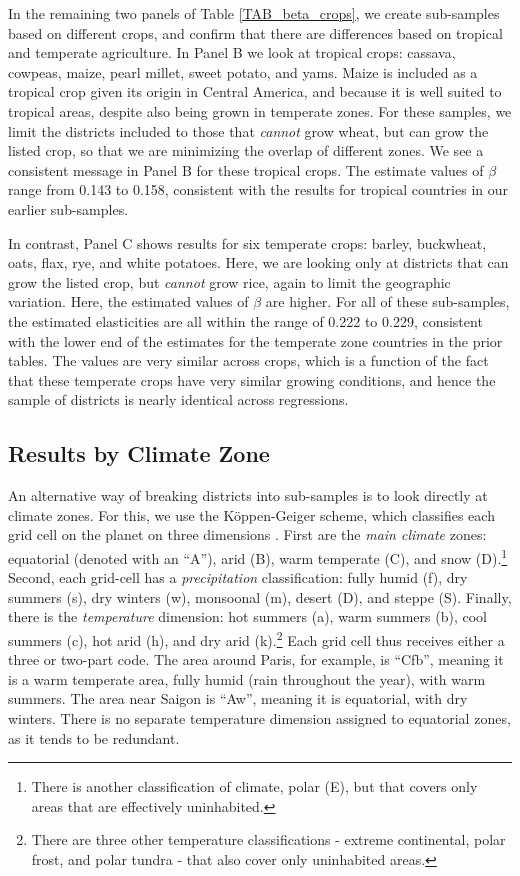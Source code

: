 \documentclass[11pt]{article}
\begin{document}
In the remaining two panels of Table \ref{TAB_beta_crops}, we create sub-samples based on different crops, and confirm that there are differences based on tropical and temperate agriculture. In Panel B we look at tropical crops: cassava, cowpeas, maize, pearl millet, sweet potato, and yams. Maize is included as a tropical crop given its origin in Central America, and because it is well suited to tropical areas, despite also being grown in temperate zones. For these samples, we limit the districts included to those that \textit{cannot} grow wheat, but can grow the listed crop, so that we are minimizing the overlap of different zones. We see a consistent message in Panel B for these tropical crops. The estimate values of $\beta$ range from 0.143 to 0.158, consistent with the results for tropical countries in our earlier sub-samples.

In contrast, Panel C shows results for six temperate crops: barley, buckwheat, oats, flax, rye, and white potatoes. Here, we are looking only at districts that can grow the listed crop, but \textit{cannot} grow rice, again to limit the geographic variation. Here, the estimated values of $\beta$ are higher. For all of these sub-samples, the estimated elasticities are all within the range of 0.222 to 0.229, consistent with the lower end of the estimates for the temperate zone countries in the prior tables. The values are very similar across crops, which is a function of the fact that these temperate crops have very similar growing conditions, and hence the sample of districts is nearly identical across regressions. 

\subsection{Results by Climate Zone}
An alternative way of breaking districts into sub-samples is to look directly at climate zones. For this, we use the K{\"o}ppen-Geiger scheme, which classifies each grid cell on the planet on three dimensions \citep{kottek2006}. First are the \textit{main climate} zones: equatorial (denoted with an ``A''), arid (B), warm temperate (C), and snow (D).\footnote{There is another classification of climate, polar (E), but that covers only areas that are effectively uninhabited.} Second, each grid-cell has a \textit{precipitation} classification: fully humid (f), dry summers (s), dry winters (w), monsoonal (m), desert (D), and steppe (S). Finally, there is the \textit{temperature} dimension: hot summers (a), warm summers (b), cool summers (c), hot arid (h), and dry arid (k).\footnote{There are three other temperature classifications - extreme continental, polar frost, and polar tundra - that also cover only uninhabited areas.} Each grid cell thus receives either a three or two-part code. The area around Paris, for example, is ``Cfb'', meaning it is a warm temperate area, fully humid (rain throughout the year), with warm summers. The area near Saigon is ``Aw'', meaning it is equatorial, with dry winters. There is no separate temperature dimension assigned to equatorial zones, as it tends to be redundant.
\end{document}
